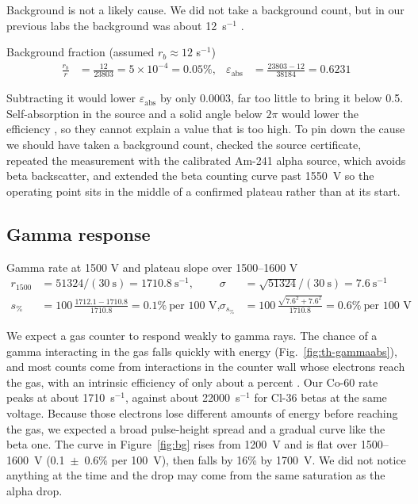\documentclass[12pt]{article}
\begin{document}
Background is not a likely cause. We did not take a background count, but in our previous labs the background was about 12~s$^{-1}$ \cite{lab3}.
 
\begin{samplecalc}{Background fraction (assumed $r_b \approx 12$ s$^{-1}$)}
\begin{align*}
\frac{r_b}{r} &= \frac{12}{23803} = 5\times10^{-4} = 0.05\%, &
\varepsilon_{\text{abs}} &= \frac{23803 - 12}{38184} = 0.6231
\end{align*}
\end{samplecalc}
 
Subtracting it would lower $\varepsilon_{\text{abs}}$ by only 0.0003, far too little to bring it below 0.5. Self-absorption in the source and a solid angle below $2\pi$ would lower the efficiency \cite{knoll}, so they cannot explain a value that is too high. To pin down the cause we should have taken a background count, checked the source certificate, repeated the measurement with the calibrated Am-241 alpha source, which avoids beta backscatter, and extended the beta counting curve past 1550~V so the operating point sits in the middle of a confirmed plateau rather than at its start.
 
\subsection{Gamma response}
 
\begin{samplecalc}{Gamma rate at 1500 V and plateau slope over 1500--1600 V}
\begin{align*}
r_{1500} &= 51324/(30\ \text{s}) = 1710.8\ \text{s}^{-1}, & \sigma &= \sqrt{51324}/(30\ \text{s}) = 7.6\ \text{s}^{-1}\\
s_{\%} &= 100\,\frac{1712.1 - 1710.8}{1710.8} = 0.1\%\ \text{per 100 V}, & \sigma_{s_\%} &= 100\,\frac{\sqrt{7.6^2 + 7.6^2}}{1710.8} = 0.6\%\ \text{per 100 V}
\end{align*}
\end{samplecalc}
 
We expect a gas counter to respond weakly to gamma rays. The chance of a gamma interacting in the gas falls quickly with energy (Fig.~\ref{fig:th-gammaabs}), and most counts come from interactions in the counter wall whose electrons reach the gas, with an intrinsic efficiency of only about a percent \cite{knoll}. Our Co-60 rate peaks at about 1710~s$^{-1}$, against about 22000~s$^{-1}$ for Cl-36 betas at the same voltage. Because those electrons lose different amounts of energy before reaching the gas, we expected a broad pulse-height spread and a gradual curve like the beta one. The curve in Figure~\ref{fig:bg} rises from 1200~V and is flat over 1500--1600~V (0.1~$\pm$~0.6\% per 100~V), then falls by 16\% by 1700~V. We did not notice anything at the time and the drop may come from the same saturation as the alpha drop.
 
\end{document}
